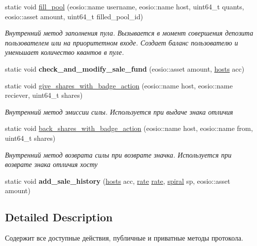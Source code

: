 \begin{DoxyCompactItemize}
static void \mbox{\hyperlink{classunicore_a415141b20af92120acd7a752d646b1fa}{fill\+\_\+pool}} (eosio\+::name username, eosio\+::name host, uint64\+\_\+t quants, eosio\+::asset amount, uint64\+\_\+t filled\+\_\+pool\+\_\+id)
\begin{DoxyCompactList}\small\item\em Внутренний метод заполнения пула. Вызывается в момент совершения депозита пользователем или на приоритетном входе. Создает баланс пользователю и уменьшает количество квантов в пуле. \end{DoxyCompactList}\item 
\mbox{\label{classunicore_a5801b4011531f5cc142fd1cf28d6b6be}} 
static void {\bfseries check\+\_\+and\+\_\+modify\+\_\+sale\+\_\+fund} (eosio\+::asset amount, \mbox{\hyperlink{structhosts}{hosts}} acc)
\item 
static void \mbox{\hyperlink{classunicore_a21ad2432a12016b8907d553fc3c02cc4}{give\+\_\+shares\+\_\+with\+\_\+badge\+\_\+action}} (eosio\+::name host, eosio\+::name reciever, uint64\+\_\+t shares)
\begin{DoxyCompactList}\small\item\em Внутренний метод эмиссии силы. Используется при выдаче знака отличия \end{DoxyCompactList}\item 
static void \mbox{\hyperlink{classunicore_aa78e3ba614a74bf7edd3fdfa0b048b23}{back\+\_\+shares\+\_\+with\+\_\+badge\+\_\+action}} (eosio\+::name host, eosio\+::name from, uint64\+\_\+t shares)
\begin{DoxyCompactList}\small\item\em Внутренний метод возврата силы при возврате значка. Используется при возврате знака отличия хосту \end{DoxyCompactList}\item 
\mbox{\label{classunicore_ad58e00b35b02b50991c8fdb0307ce3c1}} 
static void {\bfseries add\+\_\+sale\+\_\+history} (\mbox{\hyperlink{structhosts}{hosts}} acc, \mbox{\hyperlink{structrate}{rate}} \mbox{\hyperlink{structrate}{rate}}, \mbox{\hyperlink{structspiral}{spiral}} sp, eosio\+::asset amount)
\end{DoxyCompactItemize}


\subsection{Detailed Description}
Содержит все доступные действия, публичные и приватные методы протокола. 

